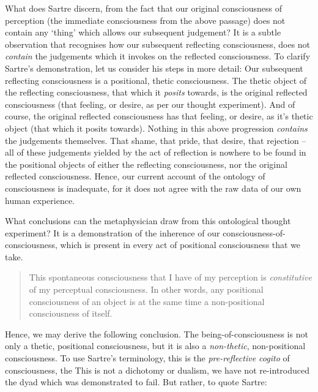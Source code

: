 \noindent
What does Sartre discern, from the fact that our original consciousness of perception (the immediate consciousness from the above passage) does not contain any \enquote*{thing} which allows our subsequent judgement? It is a subtle observation that recognises how our subsequent reflecting consciousness, does not \emph{contain} the judgements which it invokes on the reflected consciousness.
To clarify Sartre's demonstration, let us consider his steps in more detail:
Our subsequent reflecting consciousness is a positional, thetic consciousness. The thetic object of the reflecting consciousness, that which it \emph{posits} towards, is the original reflected consciousness (that feeling, or desire, as per our thought experiment). And of course, the original reflected consciousness has that feeling, or desire, as it's thetic object (that which it posits towards). Nothing in this above progression \emph{contains} the judgements themselves. That shame, that pride, that desire, that rejection -- all of these judgements yielded by the act of reflection is nowhere to be found in the positional objects of either the reflecting consciousness, nor the original reflected consciousness. 
Hence, our current account of the ontology of consciousness is inadequate, for it does not agree with the raw data of our own human experience.

What conclusions can the metaphysician draw from this ontological thought experiment? It is a demonstration of the inherence of our consciousness-of-consciousness, which is present in every act of positional consciousness that we take. 
\blockcquote[11]{Sartre}{This spontaneous consciousness that I have of my perception is \emph{constitutive} of my perceptual consciousness. In other words, any positional consciousness of an object is at the same time a non-positional consciousness of itself.} Hence, we may derive the following conclusion. The being-of-consciousness is not only a thetic, positional consciousness, but it is also a \emph{non-thetic}, non-positional consciousness. To use Sartre's terminology, this is the \emph{pre-reflective cogito} of consciousness, the  This is not a dichotomy or dualism, we have not re-introduced the dyad which was demonstrated to fail. But rather, to quote Sartre:

